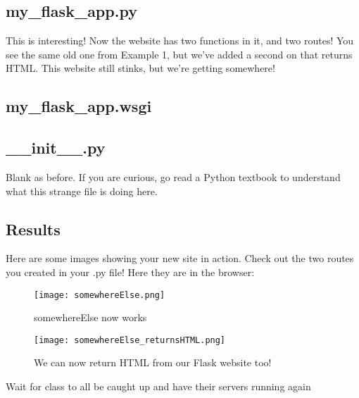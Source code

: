 \documentclass[10pt]{article}
\begin{document}


\subsection{my\_flask\_app.py}
This is interesting! Now the website has two functions in it, and two routes!
You see the same old one from Example 1, but we've added a second on that
returns HTML. This website still stinks, but we're getting somewhere! 



\subsection{my\_flask\_app.wsgi}


\subsection{\_\_init\_\_.py}
Blank as before. If you are curious, go read a Python textbook to understand what this strange file
is doing here.

\subsection{ Results }
Here are some images showing your new site in action. Check out the two routes
you created in your .py file! Here they are in the browser:

\begin{figure}[h]
  \centering
    \texttt{[image: somewhereElse.png]}
  \caption{somewhereElse now works}
	\label{fig:sameold}
\end{figure}

\begin{figure}[h]
  \centering
    \texttt{[image: somewhereElse\_returnsHTML.png]}
  \caption{We can now return HTML from our Flask website too!}
\label{fig:returnshtml}
\end{figure}

{\LARGE Wait for class to all be caught up and have their servers running again}
\end{document}
